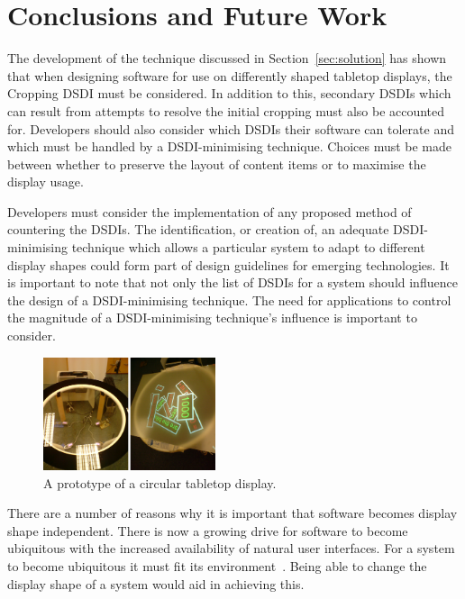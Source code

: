 \documentclass[review,5p,times,twocolumn]{elsarticle}
\begin{document}
\section{Conclusions and Future Work}
\label{sec:conclusion}

The development of the technique discussed in Section~\ref{sec:solution} has shown that when designing software for use on differently shaped tabletop displays, the Cropping \ac{DSDI} must be considered.
In addition to this, secondary \acp{DSDI} which can result from attempts to resolve the initial cropping must also be accounted for.
Developers should also consider which \acp{DSDI} their software can tolerate and which must be handled by a \ac{DSDI}-minimising technique.
Choices must be made between whether to preserve the layout of content items or to maximise the display usage.

Developers must consider the implementation of any proposed method of countering the \acp{DSDI}.
The identification, or creation of, an adequate \ac{DSDI}-minimising technique which allows a particular system to adapt to different display shapes could form part of design guidelines for emerging technologies.
It is important to note that not only the list of \acp{DSDI} for a system should influence the design of a \ac{DSDI}-minimising technique.
The need for applications to control the magnitude of a \ac{DSDI}-minimising technique's influence is important to consider.

\begin{figure}[h]
 \centering
   \includegraphics[width=0.45\textwidth]{figures/prototype.png}
   \caption{A prototype of a circular tabletop display.}
   \label{fig:prototypeTabletop}
\end{figure}

There are a number of reasons why it is important that software becomes display shape independent.
There is now a growing drive for software to become ubiquitous with the increased availability of natural user interfaces.
For a system to become ubiquitous it must fit its environment~\cite{Greenfield2006}.
Being able to change the display shape of a system would aid in achieving this.
\end{document}

